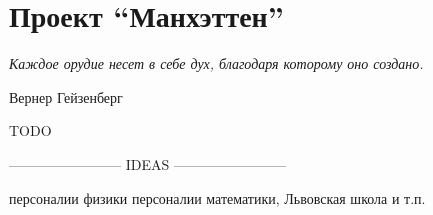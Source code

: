\chapter{Проект ``Манхэттен''}\label{ch:manhattan_project}

\epigraph{\emph{Каждое орудие несет в себе дух, \break благодаря которому оно создано.}}
{Вернер Гейзенберг}

TODO

------------------------ IDEAS ------------------------ 

персоналии физики
персоналии математики, Львовская школа и т.п.
